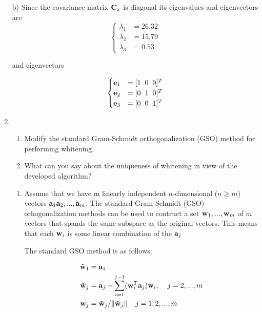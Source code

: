 \begin{enumerate}
\begin{solution}
    b) Since the covariance matrix $\mathbf{C}_x$ is diagonal its
    eigenvalues and eigenvectors are
    \[
    \begin{cases}
      \lambda_1 &= 26.32 \\
      \lambda_2 &= 15.79 \\
      \lambda_3 &= 0.53
    \end{cases}
    \]

    and eigenvectors

    \[
    \begin{cases}
      \mathbf{e}_1 &= [1 \hspace{2mm} 0 \hspace{2mm} 0]^T \\
      \mathbf{e}_2 &= [0 \hspace{2mm} 1 \hspace{2mm} 0]^T \\
      \mathbf{e}_3 &= [0 \hspace{2mm} 0 \hspace{2mm} 1]^T
    \end{cases}
    \]

  \end{solution}

\item
  \begin{enumerate}
  \item Modify the standard Gram-Schmidt orthogonalization (GSO)
    method for performing whitening.
  \item What can you say about the uniqueness of whitening in view of
    the developed algorithm?
  \end{enumerate}
  
  \begin{solution}

    \begin{enumerate}
    \item Assume that we have m linearly independent $n$-dimensional
      ($n\geq m$) vectors $\mathbf{a}_1 \mathbf{a}_2, ..., \mathbf{a}_m$,
      The standard Gram-Schmidt (GSO) orhogonalization methods can be
      used to contruct a set $\mathbf{w}_1, ..., \mathbf{w}_m$ of $m$
      vectors that spands the same subspace as the original
      vectors. This means that each $\mathbf{w}_i$ is some linear
      combination of the $\mathbf{a}_j$

      The standard GSO method is as follows:

      \[
      \begin{split}
        \tilde{\mathbf{w}}_1 &= \mathbf{a}_1 \\
        \tilde{\mathbf{w}}_j &= \mathbf{a}_j - \sum_{i=1}^{j-1}
        (\mathbf{w}_i^T
        \mathbf{a}_j)\mathbf{w}_i, \hspace{4mm} j=2,...,m \\
        \mathbf{w}_j &= \tilde{\mathbf{w}}_j / \| \tilde{\mathbf{w}}_j \|
        \hspace{4mm} j=1,2,...,m
      \end{split}
      \]


\end{enumerate}
\end{solution}
\end{enumerate}
